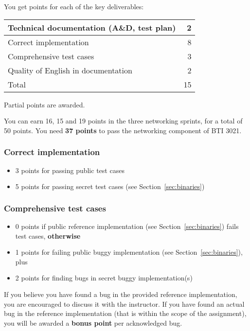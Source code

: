 \documentclass{article}
\begin{document}
You get points for each of the key deliverables:
\begin{center}
\begin{tabular}{l|r}
Technical documentation (A\&D, test plan) &  2 \\ \hline
Correct implementation                    &  8 \\ \hline
Comprehensive test cases                  &  3 \\ \hline
Quality of English in documentation       &  2 \\ \hline \hline
Total                                     & 15
\end{tabular}
\end{center}

Partial points are awarded.

You can earn 16, 15 and 19 points in the three networking sprints, for
a total of 50 points.  You need {\bf 37 points} to pass the networking
component of BTI 3021.



\subsubsection{Correct implementation}
\begin{itemize}
\item 3 points for passing public test cases
\item 5 points for passing secret test cases (see Section~\ref{sec:binaries})
\end{itemize}

\subsubsection{Comprehensive test cases}
\begin{itemize}
\item 0 points if public reference implementation (see Section~\ref{sec:binaries})
      fails test cases, {\bf otherwise}
\item 1 points for failing public buggy implementation (see Section~\ref{sec:binaries}),
       plus
\item 2 points for finding bugs in secret buggy implementation(s)
\end{itemize}

If you believe you have found a bug in the provided reference
implementation, you are encouraged to discuss it with the
instructor. If you have found an actual bug in the reference
implementation (that is within the scope of the assignment), you will
be awarded a {\bf bonus point} per acknowledged bug.
\end{document}
